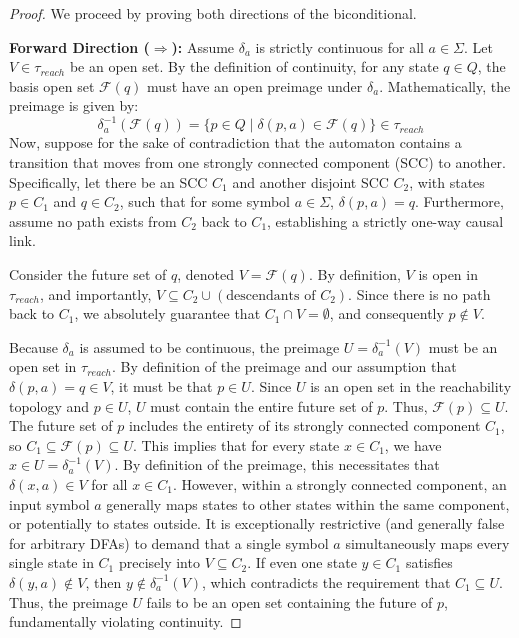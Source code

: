 \begin{proof}
We proceed by proving both directions of the biconditional.

\textbf{Forward Direction ($\Rightarrow$):}
Assume $\delta_a$ is strictly continuous for all $a \in \Sigma$. 
Let $V \in \tau_{reach}$ be an open set. By the definition of continuity, for any state $q \in Q$, the basis open set $\mathcal{F}(q)$ must have an open preimage under $\delta_a$. Mathematically, the preimage is given by:
\[
\delta_a^{-1}(\mathcal{F}(q)) = \{ p \in Q \mid \delta(p, a) \in \mathcal{F}(q) \} \in \tau_{reach}
\]
Now, suppose for the sake of contradiction that the automaton contains a transition that moves from one strongly connected component (SCC) to another. Specifically, let there be an SCC $C_1$ and another disjoint SCC $C_2$, with states $p \in C_1$ and $q \in C_2$, such that for some symbol $a \in \Sigma$, $\delta(p, a) = q$. Furthermore, assume no path exists from $C_2$ back to $C_1$, establishing a strictly one-way causal link.

Consider the future set of $q$, denoted $V = \mathcal{F}(q)$. By definition, $V$ is open in $\tau_{reach}$, and importantly, $V \subseteq C_2 \cup (\text{descendants of } C_2)$. Since there is no path back to $C_1$, we absolutely guarantee that $C_1 \cap V = \emptyset$, and consequently $p \notin V$.

Because $\delta_a$ is assumed to be continuous, the preimage $U = \delta_a^{-1}(V)$ must be an open set in $\tau_{reach}$. By definition of the preimage and our assumption that $\delta(p, a) = q \in V$, it must be that $p \in U$. 
Since $U$ is an open set in the reachability topology and $p \in U$, $U$ must contain the entire future set of $p$. Thus, $\mathcal{F}(p) \subseteq U$.
The future set of $p$ includes the entirety of its strongly connected component $C_1$, so $C_1 \subseteq \mathcal{F}(p) \subseteq U$. 
This implies that for every state $x \in C_1$, we have $x \in U = \delta_a^{-1}(V)$. By definition of the preimage, this necessitates that $\delta(x, a) \in V$ for all $x \in C_1$.
However, within a strongly connected component, an input symbol $a$ generally maps states to other states within the same component, or potentially to states outside. It is exceptionally restrictive (and generally false for arbitrary DFAs) to demand that a single symbol $a$ simultaneously maps every single state in $C_1$ precisely into $V \subseteq C_2$. If even one state $y \in C_1$ satisfies $\delta(y, a) \notin V$, then $y \notin \delta_a^{-1}(V)$, which contradicts the requirement that $C_1 \subseteq U$. Thus, the preimage $U$ fails to be an open set containing the future of $p$, fundamentally violating continuity.


\end{proof}
